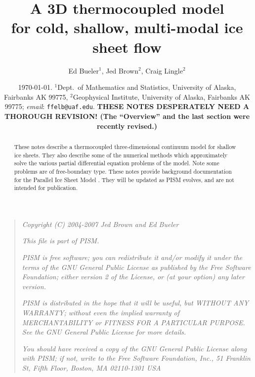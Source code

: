 \documentclass[12pt,final]{amsart}%
\newcommand{\normalspacing}{\renewcommand{\baselinestretch}{1.1}\tiny\normalsize}
\newcommand{\tablespacing}{\renewcommand{\baselinestretch}{1.0}\tiny\normalsize}
\theoremstyle{plain}
\theoremstyle{definition}
\theoremstyle{remark}
\newcommand{\mtt}{\texttt}
\begin{document}
\title[A 3D thermocoupled model for ice sheets]{A 3D thermocoupled model \\ for cold, shallow, multi-modal ice sheet flow}

\author[Bueler, Brown, and Lingle]{Ed Bueler$^1$, Jed Brown$^2$, Craig Lingle$^2$}

\date{\scriptsize \today.   $^1$Dept.~of Mathematics and Statistics, University of Alaska, Fairbanks AK 99775, $^2$Geophysical Institute, University of Alaska, Fairbanks AK 99775;  \emph{email}: \mtt{ffelb@uaf.edu}.  \textbf{THESE NOTES DESPERATELY NEED A THOROUGH REVISION!  (The ``Overview'' and the last section were recently revised.)}\normalsize}

\begin{abstract}  These notes describe a thermocoupled three-dimensional continuum model for shallow ice sheets.  They also describe some of the numerical methods which approximately solve the various partial differential equation problems of the model.  Note some problems are of free-boundary type.  These notes provide background documentation for the Parallel Ice Sheet Model  \citep{pism-web-page}.  They will be updated as PISM evolves, and are not intended for publication.\end{abstract}

\maketitle
\tablespacing
\setcounter{tocdepth}{1}
\tableofcontents


\newpage
\phantom{bob}
\vspace{2in}
\begin{quote}
\textsl{Copyright (C) 2004-2007 Jed Brown and Ed Bueler}
\medskip

\noindent \textsl{This file is part of PISM.}
\medskip

\noindent \textsl{PISM is free software; you can redistribute it and/or modify it under the terms of the GNU General Public License as published by the Free Software Foundation; either version 2 of the License, or (at your option) any later version.}
\medskip

\noindent \textsl{PISM is distributed in the hope that it will be useful, but WITHOUT ANY WARRANTY; without even the implied warranty of MERCHANTABILITY or FITNESS FOR A PARTICULAR PURPOSE.  See the GNU General Public License for more details.}
\medskip

\noindent \textsl{You should have received a copy of the GNU General Public License along with PISM; if not, write to the Free Software Foundation, Inc., 51 Franklin St, Fifth Floor, Boston, MA  02110-1301 USA}
\end{quote}
\vspace{1in}
\normalspacing
\end{document}
